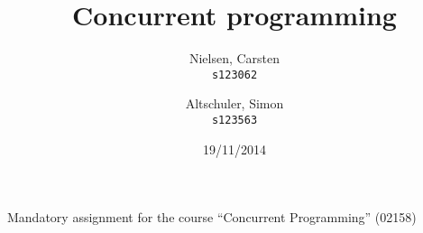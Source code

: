 \documentclass{article}
\title{Concurrent programming}
\author{
  Nielsen, Carsten\\
  \texttt{s123062}
  \and
  Altschuler, Simon\\
  \texttt{s123563}
}
\date{19/11/2014}
\begin{document}
\maketitle

\begin{center}
  Mandatory assignment for the course ``Concurrent Programming'' (02158)
\end{center}
\newpage

\tableofcontents
\newpage









\newpage

\end{document}
